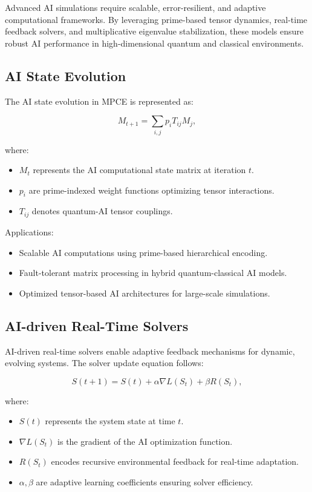 \documentclass{article}
\theoremstyle{plain}
\begin{document}
Advanced AI simulations require scalable, error-resilient, and adaptive computational frameworks. By leveraging prime-based tensor dynamics, real-time feedback solvers, and multiplicative eigenvalue stabilization, these models ensure robust AI performance in high-dimensional quantum and classical environments.

\subsection{AI State Evolution}

The AI state evolution in MPCE is represented as:

\begin{equation}
M_{t+1} = \sum_{i,j} p_i T_{ij} M_j,
\end{equation}

where:
\begin{itemize}
    \item $M_t$ represents the AI computational state matrix at iteration $t$.
    \item $p_i$ are prime-indexed weight functions optimizing tensor interactions.
    \item $T_{ij}$ denotes quantum-AI tensor couplings.
\end{itemize}

Applications:
\begin{itemize}
    \item Scalable AI computations using prime-based hierarchical encoding.
    \item Fault-tolerant matrix processing in hybrid quantum-classical AI models.
    \item Optimized tensor-based AI architectures for large-scale simulations.
\end{itemize}

\subsection{AI-driven Real-Time Solvers}

AI-driven real-time solvers enable adaptive feedback mechanisms for dynamic, evolving systems. The solver update equation follows:

\begin{equation}
S(t+1) = S(t) + \alpha \nabla L(S_t) + \beta R(S_t),
\end{equation}

where:
\begin{itemize}
    \item $S(t)$ represents the system state at time $t$.
    \item $\nabla L(S_t)$ is the gradient of the AI optimization function.
    \item $R(S_t)$ encodes recursive environmental feedback for real-time adaptation.
    \item $\alpha, \beta$ are adaptive learning coefficients ensuring solver efficiency.
\end{itemize}
\end{document}
